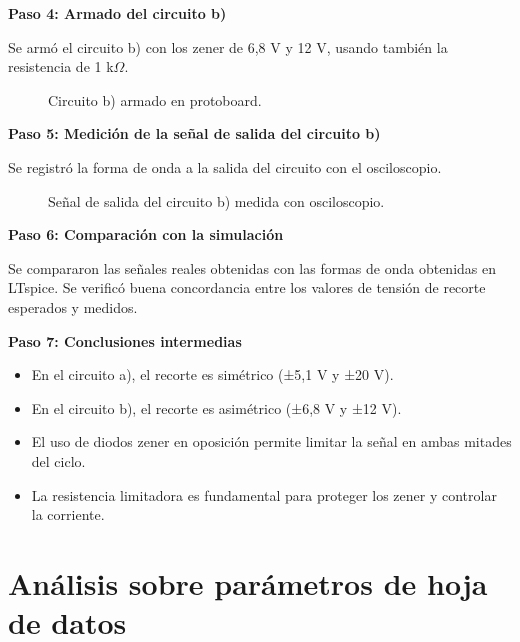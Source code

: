 \textbf{Paso 4: Armado del circuito b)}

Se armó el circuito b) con los zener de 6,8 V y 12 V, usando también la resistencia de 1 k$\Omega$.

\begin{figure}[H]
    \centering
    \caption{Circuito b) armado en protoboard.}
\end{figure}

\textbf{Paso 5: Medición de la señal de salida del circuito b)}

Se registró la forma de onda a la salida del circuito con el osciloscopio.

\begin{figure}[H]
    \centering
    \caption{Señal de salida del circuito b) medida con osciloscopio.}
\end{figure}

\textbf{Paso 6: Comparación con la simulación}

Se compararon las señales reales obtenidas con las formas de onda obtenidas en LTspice. Se verificó buena concordancia entre los valores de tensión de recorte esperados y medidos.

\textbf{Paso 7: Conclusiones intermedias}

\begin{itemize}
    \item En el circuito a), el recorte es simétrico (±5,1 V y ±20 V).
    \item En el circuito b), el recorte es asimétrico (±6,8 V y ±12 V).
    \item El uso de diodos zener en oposición permite limitar la señal en ambas mitades del ciclo.
    \item La resistencia limitadora es fundamental para proteger los zener y controlar la corriente.
\end{itemize}
\section{Análisis sobre parámetros de hoja de datos}